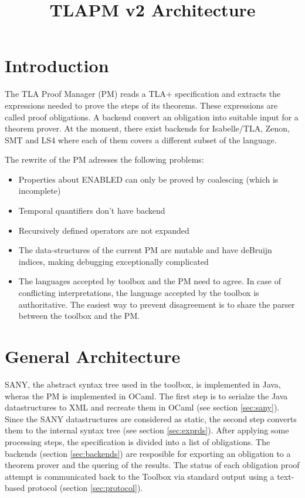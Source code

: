 \documentclass[10pt,a4paper]{article}
\title{TLAPM v2 Architecture}
\newcommand{\keyword}[1]{\textsc{#1}}
\begin{document}
\maketitle

\section{Introduction}
\label{sec:introduction}
The TLA Proof Manager (PM) reads a TLA+ specification and extracts the
 expressions needed to prove the steps of its theorems. These expressions are
 called proof obligations. A backend convert an obligation into suitable
 input for a theorem prover. At the moment, there exist backends for
 Isabelle/TLA, Zenon, SMT and LS4 where each of them covers a different subset
 of the language.

The rewrite of the PM adresses the following problems:

\begin{itemize}
\item Properties about \keyword{ENABLED} can only be proved by coalescing (which
 is incomplete)
\item Temporal quantifiers don't have backend
\item Recursively defined operators are not expanded
\item The data-structures of the current PM are mutable and have deBruijn
 indices, making debugging exceptionally complicated
\item The languages accepted by toolbox and the PM need to agree. In case of
 conflicting interpretations, the language accepted by the toolbox is
 authoritative. The easiest way to prevent disagreement is to share the parser
 between the toolbox and the PM.
\end{itemize}


\section{General Architecture}
\label{sec:general}

SANY, the abstract syntax tree used in the toolbox, is implemented in Java,
 wheras the PM is implemented in OCaml. The first step is to serialze the Java
 datastructures to XML and recreate them in OCaml (see section \ref{sec:sany}).
 Since the SANY datastructures are considered as static, the second step
 converts them to the internal syntax tree (see section \ref{sec:exprds}).
 After applying some processing steps, the specification is divided into
 a list of obligations. The backends (section \ref{sec:backends}) are resposible
 for exporting an obligation to a theorem prover and the quering of the results.
 The status of each obligation proof attempt is communicated back to the Toolbox
 via standard output using a text-based protocol (section \ref{sec:protocol}).
\end{document}
